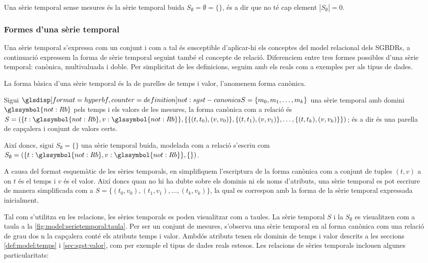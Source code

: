 Una sèrie temporal sense mesures és la sèrie temporal buida
$S_\emptyset= \emptyset = \{\}$, és a dir que no té cap element
$|S_\emptyset|=0$.

 


\subsubsection{Formes d'una sèrie temporal}


Una sèrie temporal s'expressa com un conjunt i com a tal és
susceptible d'aplicar-hi els conceptes del model relacional dels
\glspl{SGBDR}, a continuació
expressem la forma de sèrie temporal seguint també el concepte de
relació. Diferenciem entre tres formes possibles d'una sèrie temporal:
canònica, multivaluada i doble.  Per simplicitat de les definicions,
seguim amb els reals com a exemples per als tipus de dades.


La forma bàsica d'una sèrie temporal és la de parelles de temps i
valor, l'anomenem forma canònica. 
\begin{definition}
  Sigui $\glsdispdef{not:sgst-canonica}{S = \{ m_0, m_1 , \dotsc, m_k
    \}}$ una sèrie temporal amb domini $\glssymbol{not:Rb}$ pels temps
  i els valors de les mesures, la forma canònica com a relació és $S =
  ( \{t: \glssymbol{not:Rb}, v: \glssymbol{not:Rb}\}, \{ \{
  (t,t_0),(v,v_0)\}, \{(t,t_1),(v,v_1)\}, \dotsc, \{(t,t_k),(v,v_k)\}
  \} )$; és a dir és una parella de capçalera i conjunt de valors
  certs.

  Així doncs, sigui $S_{\emptyset} = \{ \}$ una sèrie temporal buida,
  modelada com a relació s'escriu com $S_{\emptyset} = ( \{t:
  \glssymbol{not:Rb}, v: \glssymbol{not:Rb}\}, \{ \} )$.
\end{definition}


A causa del format esquemàtic de les sèries temporals, en simplifiquem
l'escriptura de la forma canònica com a conjunt de tuples $(t,v)$ a on
$t$ és el temps i $v$ és el valor. Així doncs quan no hi ha dubte
sobre els dominis ni els noms d'atributs, una sèrie temporal es pot
escriure de manera simplificada com a $S = \{ (t_0,v_0), (t_1,v_1),
\dotsc, (t_k,v_k) \}$, la qual es correspon amb la forma de la sèrie
temporal expressada inicialment.


Tal com s'utilitza en les relacions, les sèries temporals es poden
visualitzar com a taules. La sèrie temporal $S$ i la $S_{\emptyset}$
es visualitzen com a taula a la
\autoref{fig:model:serietemporal:taula}.
Per ser un conjunt de mesures, s'observa una sèrie temporal en al
forma canònica com una relació de grau dos n la capçalera conté els
atributs temps i valor. Ambdós atributs tenen els dominis de temps i
valor descrits a les seccions \ref{def:model:temps} i
\ref{sec:sgst:valor}, com per exemple el tipus de dades reals
estesos. Les relacions de sèries temporals inclouen algunes
particularitats:


